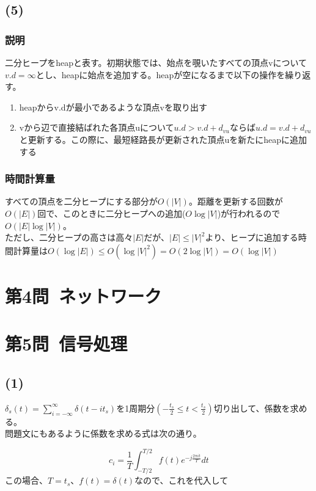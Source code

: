 \documentclass[a4paper,12pt,xelatex,ja=standard]{bxjsarticle}
\begin{document}
\subsection*{(5)}
\subsubsection*{説明}
二分ヒープをheapと表す。初期状態では、始点を覗いたすべての頂点vについて$v.d = \infty$とし、heapに始点を追加する。heapが空になるまで以下の操作を繰り返す。

\begin{enumerate}
  \item heapからv.dが最小であるような頂点vを取り出す
  \item vから辺で直接結ばれた各頂点uについて$u.d > v.d + d_{vu}$ならば$u.d = v.d + d_{vu}$と更新する。この際に、最短経路長が更新された頂点uを新たにheapに追加する
\end{enumerate}

\subsubsection*{時間計算量}
すべての頂点を二分ヒープにする部分が$O(|V|)$。距離を更新する回数が$O(|E|)$回で、このときに二分ヒープへの追加($O\log |V|$)が行われるので$O(|E| \log |V|)$。\\
ただし、二分ヒープの高さは高々$|E|$だが、$|E| \leq |V|^2$より、ヒープに追加する時間計算量は$O(\log |E|) \leq O(\log |V|^2) = O(2 \log |V|) = O(\log |V|)$

\section*{第4問\ ネットワーク}

\section*{第5問\ 信号処理}
\subsection*{(1)}
$\delta_s(t) = \sum^{\infty}_{i = - \infty} \delta(t - it_s)$を1周期分$\left( -\frac{t_s}{2} \leq t < \frac{t_s}{2}\right)$切り出して、係数を求める。\\
問題文にもあるように係数を求める式は次の通り。

\[
  c_i = \frac{1}{T}\int^{T/2}_{-T/2}f(t) e^{-j \frac{2 \pi i t}{T}}dt
\]
この場合、$T = t_s$、$f(t) = \delta(t)$なので、これを代入して
\end{document}
